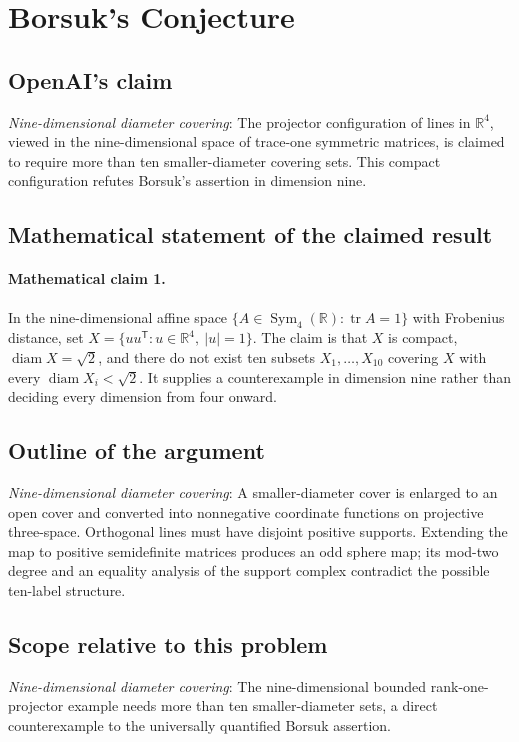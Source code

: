 \documentclass[11pt]{article}
\begin{document}
\section*{Borsuk's Conjecture}

\subsection{OpenAI's claim}
\textit{Nine-dimensional diameter covering}: The projector configuration of lines in $\mathbb R^4$, viewed in the nine-dimensional space of trace-one symmetric matrices, is claimed to require more than ten smaller-diameter covering sets. This compact configuration refutes Borsuk’s assertion in dimension nine.

\subsection{Mathematical statement of the claimed result}
\paragraph{Mathematical claim 1.} In the nine-dimensional affine space $\{A\in\operatorname{Sym}_4(\mathbb R):\operatorname{tr}A=1\}$ with Frobenius distance, set $X=\{uu^{\mathsf T}:u\in\mathbb R^4,\ |u|=1\}$. The claim is that $X$ is compact, $\operatorname{diam}X=\sqrt2$, and there do not exist ten subsets $X_1,\ldots,X_{10}$ covering $X$ with every $\operatorname{diam}X_i<\sqrt2$. It supplies a counterexample in dimension nine rather than deciding every dimension from four onward.

\subsection{Outline of the argument}
\textit{Nine-dimensional diameter covering}: A smaller-diameter cover is enlarged to an open cover and converted into nonnegative coordinate functions on projective three-space. Orthogonal lines must have disjoint positive supports. Extending the map to positive semidefinite matrices produces an odd sphere map; its mod-two degree and an equality analysis of the support complex contradict the possible ten-label structure.

\subsection{Scope relative to this problem}
\textit{Nine-dimensional diameter covering}: The nine-dimensional bounded rank-one-projector example needs more than ten smaller-diameter sets, a direct counterexample to the universally quantified Borsuk assertion.
\end{document}
